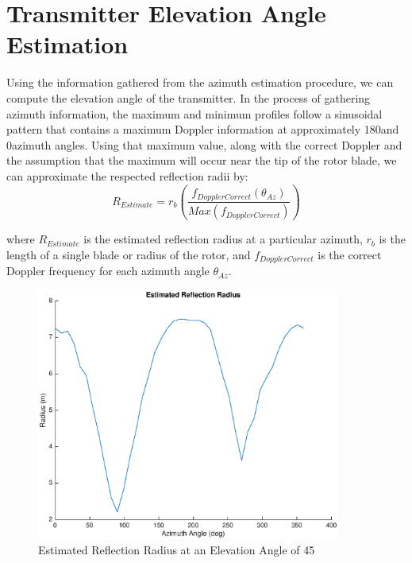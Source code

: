 \section{Transmitter Elevation Angle Estimation} \label{sec:transmitter_elevation_angle_estimation}
Using the information gathered from the azimuth estimation procedure, we can compute the elevation angle of the transmitter. In the process of gathering azimuth information, the maximum and minimum profiles follow a sinusoidal pattern that contains a maximum Doppler information at approximately 180\textdegree \space and 0\textdegree \space azimuth angles. Using that maximum value, along with the correct Doppler and the assumption that the maximum will occur near the tip of the rotor blade, we can approximate the respected reflection radii by:
\begin{equation}
	R_{Estimate} = r_b \left(\frac{f_{DopplerCorrect}(\theta_{Az})}{Max(f_{DopplerCorrect})}\right)
	\label{eqn:r_estimate}
\end{equation}

where $R_{Estimate}$ is the estimated reflection radius at a particular azimuth, $r_b$ is the length of a single blade or radius of the rotor, and $f_{DopplerCorrect}$ is the correct Doppler frequency for each azimuth angle $\theta_{Az}$.

\begin{figure}
	\begin{center}
		\includegraphics[width=10cm]{images/results/Estimated_reflection_radius_Azimuth_range.eps}
		\caption{Estimated Reflection Radius at an Elevation Angle of 45\textdegree}
		\label{fig:est_radius_azimuth_range}
	\end{center}
\end{figure}

